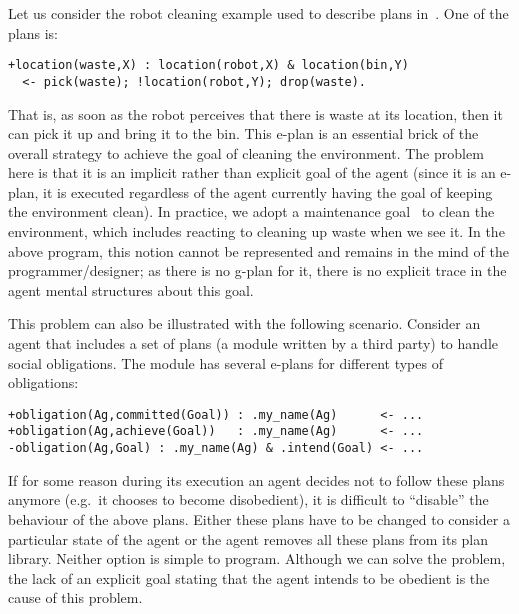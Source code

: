 %
Let us consider the robot cleaning example used to describe plans
in~\cite{Rao96}. 
%
One of the plans is:

\begin{small}
\begin{verbatim}
+location(waste,X) : location(robot,X) & location(bin,Y)
  <- pick(waste); !location(robot,Y); drop(waste).
\end{verbatim}
\end{small}

\noindent That is, as soon as the robot perceives that there is
waste at its location, then it can pick it up and bring it to the bin.
%
This e-plan is an essential brick of the overall strategy to achieve
the goal of cleaning the environment. The problem here is that it is
an implicit rather than explicit goal of the agent (since it is an e-plan, 
it is executed regardless of the agent currently having the goal of keeping the
environment clean). In practice, we adopt a maintenance
goal~\cite{Duff:2006:PMG:1160633.1160817} to clean the environment,
which includes reacting to cleaning up waste when we see it. In the
above program, this notion cannot be represented and remains in the
mind of the programmer/designer; as there is no g-plan for it, there
is no explicit trace in the agent mental structures about this
goal.

This problem can also be illustrated with the following
scenario. Consider an agent that includes a set of plans (a module
written by a third party) to handle social obligations. The module has
several e-plans for different types of obligations:
\begin{small}
\begin{verbatim}
+obligation(Ag,committed(Goal)) : .my_name(Ag)      <- ...
+obligation(Ag,achieve(Goal))   : .my_name(Ag)      <- ...
-obligation(Ag,Goal) : .my_name(Ag) & .intend(Goal) <- ...
\end{verbatim}
\end{small}
If for some reason during its execution an agent decides not to follow
these plans anymore (e.g.\ it chooses to become disobedient), it is
difficult to ``disable'' the behaviour of the above plans. Either
these plans have to be changed to consider a particular state of the
agent or the agent removes all these plans from its plan
library. Neither option is simple to
program. %
Although we can solve the problem, the lack of an explicit goal
stating that the agent intends to be obedient is the cause of this
problem.

